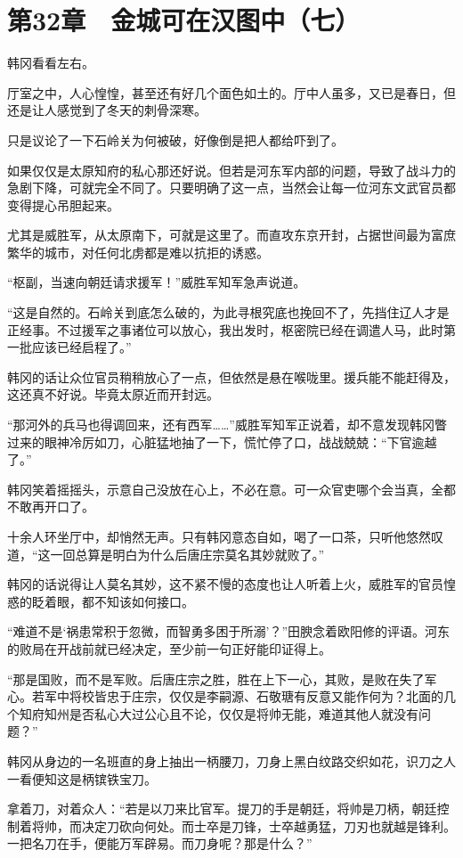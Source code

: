 \section{第32章　金城可在汉图中（七）}

韩冈看看左右。

厅室之中，人心惶惶，甚至还有好几个面色如土的。厅中人虽多，又已是春日，但还是让人感觉到了冬天的刺骨深寒。

只是议论了一下石岭关为何被破，好像倒是把人都给吓到了。

如果仅仅是太原知府的私心那还好说。但若是河东军内部的问题，导致了战斗力的急剧下降，可就完全不同了。只要明确了这一点，当然会让每一位河东文武官员都变得提心吊胆起来。

尤其是威胜军，从太原南下，可就是这里了。而直攻东京开封，占据世间最为富庶繁华的城市，对任何北虏都是难以抗拒的诱惑。

“枢副，当速向朝廷请求援军！”威胜军知军急声说道。

“这是自然的。石岭关到底怎么破的，为此寻根究底也挽回不了，先挡住辽人才是正经事。不过援军之事诸位可以放心，我出发时，枢密院已经在调遣人马，此时第一批应该已经启程了。”

韩冈的话让众位官员稍稍放心了一点，但依然是悬在喉咙里。援兵能不能赶得及，这还真不好说。毕竟太原近而开封远。

“那河外的兵马也得调回来，还有西军……”威胜军知军正说着，却不意发现韩冈瞥过来的眼神冷厉如刀，心脏猛地抽了一下，慌忙停了口，战战兢兢：“下官逾越了。”

韩冈笑着摇摇头，示意自己没放在心上，不必在意。可一众官吏哪个会当真，全都不敢再开口了。

十余人环坐厅中，却悄然无声。只有韩冈意态自如，喝了一口茶，只听他悠然叹道，“这一回总算是明白为什么后唐庄宗莫名其妙就败了。”

韩冈的话说得让人莫名其妙，这不紧不慢的态度也让人听着上火，威胜军的官员惶惑的眨着眼，都不知该如何接口。

“难道不是‘祸患常积于忽微，而智勇多困于所溺’？”田腴念着欧阳修的评语。河东的败局在开战前就已经决定，至少前一句正好能印证得上。

“那是国败，而不是军败。后唐庄宗之胜，胜在上下一心，其败，是败在失了军心。若军中将校皆忠于庄宗，仅仅是李嗣源、石敬瑭有反意又能作何为？北面的几个知府知州是否私心大过公心且不论，仅仅是将帅无能，难道其他人就没有问题？”

韩冈从身边的一名班直的身上抽出一柄腰刀，刀身上黑白纹路交织如花，识刀之人一看便知这是柄镔铁宝刀。

拿着刀，对着众人：“若是以刀来比官军。提刀的手是朝廷，将帅是刀柄，朝廷控制着将帅，而决定刀砍向何处。而士卒是刀锋，士卒越勇猛，刀刃也就越是锋利。一把名刀在手，便能万军辟易。而刀身呢？那是什么？”

